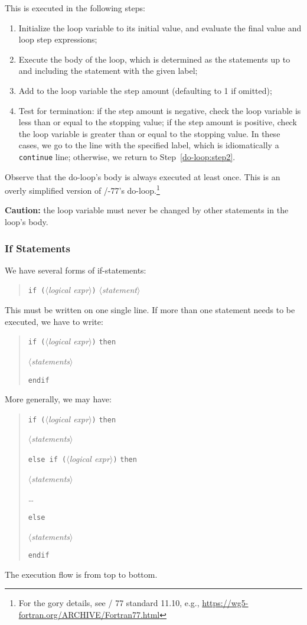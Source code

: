 This is executed in the following steps:
\begin{enumerate}
\item Initialize the loop variable to its initial value, and evaluate
  the final value and loop step expressions;
\item\label{do-loop:step2} Execute the body of the loop, which is
  determined as the statements up to and including the statement with
  the given label;
\item Add to the loop variable the step amount (defaulting to 1 if omitted);
\item Test for termination: if the step amount is negative, check the
  loop variable is less than or equal to the stopping value; if the step
  amount is positive, check the loop variable is greater than or equal
  to the stopping value. In these cases, we go to the line with the
  specified label, which is idiomatically a \texttt{continue} line;
  otherwise, we return to Step~\ref{do-loop:step2}.
\end{enumerate}
Observe that the do-loop's body is always executed at least once.
This is an overly simplified version of \FORTRAN/-77's
do-loop.\footnote{For the gory details, see \FORTRAN/ 77 standard 11.10,
e.g., \url{https://wg5-fortran.org/ARCHIVE/Fortran77.html}}

\textbf{Caution:} the loop variable must never be changed by other
statements in the loop's body.

\subsubsection{If Statements}
We have several forms of if-statements:
\begin{quote}
\noindent\texttt{if (}$\langle$\textit{logical expr\/}$\rangle$\texttt{)} $\langle$\textit{statement\/}$\rangle$
\end{quote}
This must be written on one single line. If more than one statement
needs to be executed, we have to write:
\begin{quotation}
\noindent\texttt{if (}$\langle$\textit{logical expr\/}$\rangle$\texttt{)} \texttt{then}

$\langle$\textit{statements\/}$\rangle$

\noindent\texttt{endif}
\end{quotation}
More generally, we may have:
\begin{quotation}
\noindent\texttt{if (}$\langle$\textit{logical expr\/}$\rangle$\texttt{)} \texttt{then}

$\langle$\textit{statements\/}$\rangle$

\noindent\texttt{else if (}$\langle$\textit{logical expr\/}$\rangle$\texttt{)} \texttt{then}

$\langle$\textit{statements\/}$\rangle$

\dots

\noindent\texttt{else}

$\langle$\textit{statements\/}$\rangle$

\noindent\texttt{endif}
\end{quotation}
The execution flow is from top to bottom.

